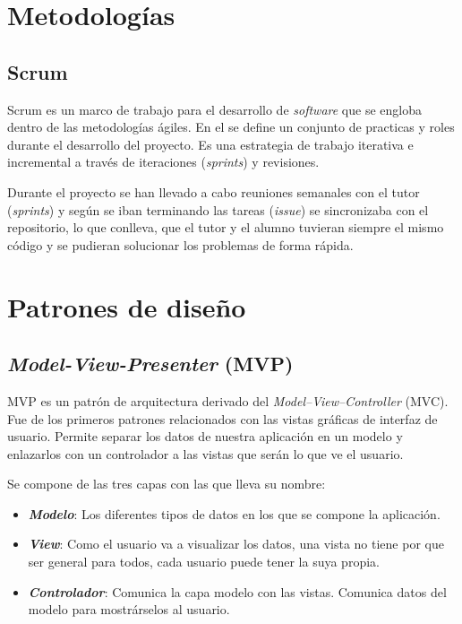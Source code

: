 
\section{Metodologías}\label{metodologias}

\subsection{Scrum}\label{scrum}

Scrum es un marco de trabajo para el desarrollo de \emph{software} que se
engloba dentro de las metodologías ágiles. En el se define un conjunto de practicas y roles durante el desarrollo del proyecto. Es una estrategia de trabajo iterativa e incremental a través de iteraciones (\emph{sprints})
y revisiones. 

Durante el proyecto se han llevado a cabo reuniones semanales con el tutor (\emph{sprints}) y según se iban terminando las tareas (\emph{issue}) se sincronizaba con el repositorio, lo que conlleva, que el tutor y el alumno tuvieran siempre el mismo código y se pudieran solucionar los problemas de forma rápida. \cite{Schwaber2004}

\section{Patrones de diseño}\label{patrones-de-diseno}

\subsection{\emph{Model-View-Presenter} (MVP)}\label{model-view-presenter-mvp}

MVP es un patrón de arquitectura derivado del
\emph{Model--View--Controller} (MVC). Fue de los primeros patrones relacionados con las vistas gráficas de interfaz de usuario. Permite separar los datos de nuestra aplicación en un modelo y enlazarlos con un controlador a las vistas que serán lo que ve el usuario.\cite{art:mvc}

Se compone de las tres capas con las que lleva su nombre:

\begin{itemize}
	\tightlist
	\item
	\textit{\textbf{Modelo}}: Los diferentes tipos de datos en los que se compone la aplicación.
	\item
	\textit{\textbf{View}}: Como el usuario va a visualizar los datos, una vista no tiene por que ser general para todos, cada usuario puede tener la suya propia.
	\item
	\textit{\textbf{Controlador}}: Comunica la capa modelo con las vistas. Comunica datos del modelo para mostrárselos al usuario.
\end{itemize}

